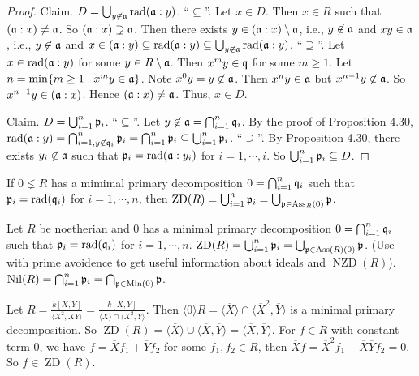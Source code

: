 \begin{proof}
    Claim. $D = \bigcup_{y \not\in \mathfrak{a}} \operatorname{rad}(\mathfrak{a}:y)$. ``$\subseteq$''. Let $x \in D$. Then $x \in R$ such that $(\mathfrak{a}:x) \neq \mathfrak{a}$. So $(\mathfrak{a}:x) \supsetneq \mathfrak{a}$. Then there exists $y \in (\mathfrak{a}:x) \setminus \mathfrak{a}$, i.e., $y \not \in \mathfrak{a}$ and $xy \in \mathfrak{a}$, i.e., $y \not \in \mathfrak{a}$ and $x \in (\mathfrak{a}:y) \subseteq \operatorname{rad}(\mathfrak{a}:y) \subseteq \bigcup_{y \not\in \mathfrak{a}} \operatorname{rad}(\mathfrak{a}:y)$. ``$\supseteq$''. Let $x \in \operatorname{rad}(\mathfrak{a}:y)$ for some $y \in R \setminus \mathfrak{a}$. Then $x^{m}y \in \mathfrak{q}$ for some $m \geq 1$. Let $n = \min\{m \geq 1 \mid x^{m}y \in \mathfrak{a}\}$. Note $x^{0}y = y \not \in \mathfrak{a}$. Then $x^{n}y \in \mathfrak{a}$ but $x^{n-1}y \not \in \mathfrak{a}$. So $x^{n-1}y \in (\mathfrak{a}:x)$. Hence $(\mathfrak{a}:x) \neq \mathfrak{a}$. Thus, $x \in D$. \par 
    Claim. $D = \bigcup_{i=1}^{n}\mathfrak{p}_i$. ``$\subseteq$''. Let $y \not\in \mathfrak{a} = \bigcap_{i=1}^{n} \mathfrak{q}_i$. By the proof of Proposition 4.30, $\operatorname{rad}(\mathfrak{a}:y) = \bigcap_{i=1,y \not \in \mathfrak{q}_i}^{n} \mathfrak{p}_i = \bigcap_{i=1}^{n} \mathfrak{p}_i \subseteq \bigcup_{i=1}^{n}\mathfrak{p}_i$. ``$\supseteq$''. By Proposition 4.30, there exists $y_i \not \in \mathfrak{a}$ such that $\mathfrak{p}_i = \operatorname{rad}(\mathfrak{a}:y_i)$ for $i = 1,\cdots,i$. So $\bigcup_{i=1}^{n} \mathfrak{p}_i \subseteq D$. 
\end{proof}

\begin{corollary}
    If $0 \lneq R$ has a mimimal primary decomposition $0 = \bigcap_{i=1}^{n} \mathfrak{q}_i$ such that $\mathfrak{p}_i = \operatorname{rad}(\mathfrak{q}_i)$ for $i = 1,\cdots,n$, then $\operatorname{ZD}(R) = \bigcup_{i=1}^{n} \mathfrak{p}_i = \bigcup_{\mathfrak{p} \in \operatorname{Ass}_R(0)}\mathfrak{p}$.
\end{corollary}

\begin{summary}
    Let $R$ be noetherian and $0$ has a minimal primary decomposition $0 = \bigcap_{i=1}^{n} \mathfrak{q}_i$ such that $\mathfrak{p}_i = \operatorname{rad}(\mathfrak{q}_i)$ for $i = 1,\cdots,n$. $\operatorname{ZD}(R) = \bigcup_{i=1}^{n} \mathfrak{p}_i = \bigcup_{\mathfrak{p} \in \operatorname{Ass}(R)(0)}\mathfrak{p}$. (Use with prime avoidence to get useful information about ideals and $\operatorname{NZD}(R)$). $\operatorname{Nil}(R) = \bigcap_{i=1}^{n} \mathfrak{p}_i = \bigcap_{\mathfrak{p} \in \operatorname{Min}(0)} \mathfrak{p}$.
\end{summary}

\begin{example*}
    Let $R = \frac{k[X,Y]}{\langle X^{2},XY \rangle} = \frac{k[X,Y]}{\langle X \rangle \cap \langle X^{2},Y \rangle}$. Then $\langle 0 \rangle R = \langle \overbar{X} \rangle \cap \langle \overbar{X}^{2}, \overbar{Y} \rangle$ is a minimal primary decomposition. So $\operatorname{ZD}(R) = \langle \overbar{X} \rangle \cup \langle \overbar{X}, \overbar{Y} \rangle = \langle \overbar{X}, \overbar{Y} \rangle$. For $f \in R$ with constant term 0, we have $f = \overbar{X}f_1 + \overbar{Y}f_2$ for some $f_1,f_2 \in R$, then $\overbar{X}f = \overbar{X}^{2}f_1 + \overbar{X} \overbar{Y} f_2 = 0$. So $f \in \operatorname{ZD}(R)$.
\end{example*}

